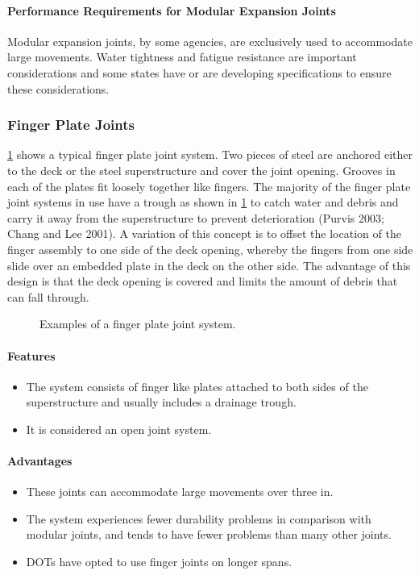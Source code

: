 \paragraph{Performance Requirements for Modular Expansion Joints}
Modular expansion joints, by some agencies, are exclusively used to accommodate large movements. Water tightness and fatigue resistance are important considerations and some states have or are developing specifications to ensure these considerations.

\subsubsection{Finger Plate Joints}
\cref{fig:finger-plate-joint-system} shows a typical finger plate joint system. Two pieces of steel are anchored either to the deck or the
steel superstructure and cover the joint opening. Grooves in each of the plates fit loosely together like fingers. The
majority of the finger plate joint systems in use have a trough as shown in \cref{fig:finger-plate-joint-system} to catch water and debris and
carry it away from the superstructure to prevent deterioration (Purvis 2003; Chang and Lee 2001). A variation of this
concept is to offset the location of the finger assembly to one side of the deck opening, whereby the fingers from one
side slide over an embedded plate in the deck on the other side. The advantage of this design is that the deck opening
is covered and limits the amount of debris that can fall through.

\begin{figure}
  \caption{Examples of a finger plate joint system.}
  \label{fig:finger-plate-joint-system}
\end{figure}

\paragraph{Features}
\begin{itemize}
  \item The system consists of finger like plates attached to both sides of the superstructure and usually includes a
  drainage trough.
  \item  It is considered an open joint system.
\end{itemize}
\paragraph{Advantages}
\begin{itemize}
  \item These joints can accommodate large movements over three in.
  \item The system experiences fewer durability problems in comparison with modular joints, and tends to have
  fewer problems than many other joints.
  \item DOTs have opted to use finger joints on longer spans.
\end{itemize}
